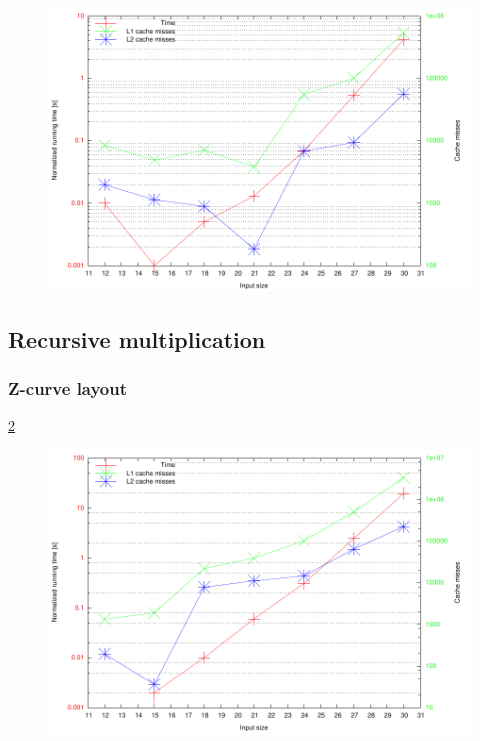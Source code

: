 \begin{figure}[h!]
  \centering
  \includegraphics[width=\textwidth]{rncnrn0.pdf}
  \label{fig:rncnrn0}
\end{figure}

\subsection{Recursive multiplication}

\subsubsection{Z-curve layout}

\ref{fig:zrzrzr0}

\begin{figure}[h!]
  \centering
  \includegraphics[width=\textwidth]{zrzrzr0.pdf}
  \label{fig:zrzrzr0}
\end{figure}
